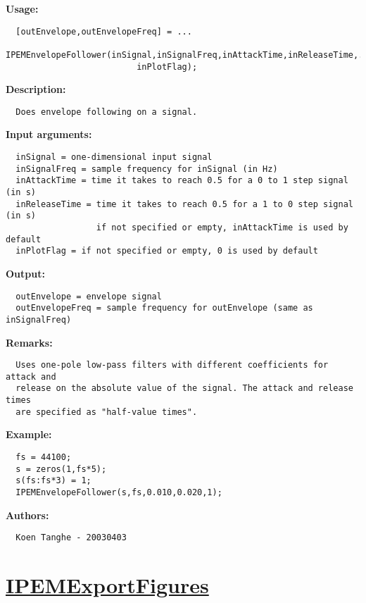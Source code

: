 \textbf{Usage:}
\begin{verbatim}  [outEnvelope,outEnvelopeFreq] = ...
     IPEMEnvelopeFollower(inSignal,inSignalFreq,inAttackTime,inReleaseTime,...
                          inPlotFlag);

\end{verbatim}
\textbf{Description:}
\begin{verbatim}  Does envelope following on a signal.

\end{verbatim}
\textbf{Input arguments:}
\begin{verbatim}  inSignal = one-dimensional input signal
  inSignalFreq = sample frequency for inSignal (in Hz)
  inAttackTime = time it takes to reach 0.5 for a 0 to 1 step signal (in s)
  inReleaseTime = time it takes to reach 0.5 for a 1 to 0 step signal (in s)
                  if not specified or empty, inAttackTime is used by default
  inPlotFlag = if not specified or empty, 0 is used by default

\end{verbatim}
\textbf{Output:}
\begin{verbatim}  outEnvelope = envelope signal
  outEnvelopeFreq = sample frequency for outEnvelope (same as inSignalFreq)

\end{verbatim}
\textbf{Remarks:}
\begin{verbatim}  Uses one-pole low-pass filters with different coefficients for attack and
  release on the absolute value of the signal. The attack and release times
  are specified as "half-value times".

\end{verbatim}
\textbf{Example:}
\begin{verbatim}  fs = 44100;
  s = zeros(1,fs*5);
  s(fs:fs*3) = 1;
  IPEMEnvelopeFollower(s,fs,0.010,0.020,1);

\end{verbatim}
\textbf{Authors:}
\begin{verbatim}  Koen Tanghe - 20030403
\end{verbatim}


\newpage
\section*{\hyperlink{Concepts:IPEMExportFigures}{IPEMExportFigures}}
\hypertarget{FuncRef:IPEMExportFigures}{}

